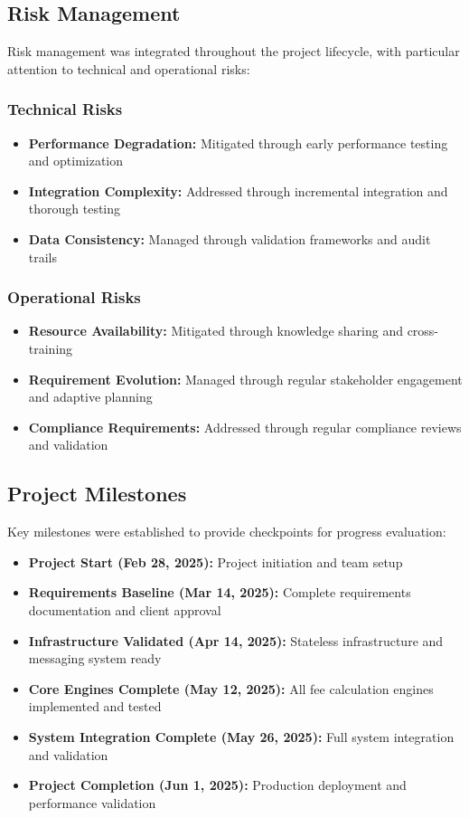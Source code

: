 \subsection{Risk Management}

Risk management was integrated throughout the project lifecycle, with particular attention to technical and operational risks:

\subsubsection{Technical Risks}

\begin{itemize}
    \item \textbf{Performance Degradation:} Mitigated through early performance testing and optimization
    \item \textbf{Integration Complexity:} Addressed through incremental integration and thorough testing
    \item \textbf{Data Consistency:} Managed through validation frameworks and audit trails
\end{itemize}

\subsubsection{Operational Risks}

\begin{itemize}
    \item \textbf{Resource Availability:} Mitigated through knowledge sharing and cross-training
    \item \textbf{Requirement Evolution:} Managed through regular stakeholder engagement and adaptive planning
    \item \textbf{Compliance Requirements:} Addressed through regular compliance reviews and validation
\end{itemize}

\subsection{Project Milestones}

Key milestones were established to provide checkpoints for progress evaluation:

\begin{itemize}
    \item \textbf{Project Start (Feb 28, 2025):} Project initiation and team setup
    \item \textbf{Requirements Baseline (Mar 14, 2025):} Complete requirements documentation and client approval
    \item \textbf{Infrastructure Validated (Apr 14, 2025):} Stateless infrastructure and messaging system ready
    \item \textbf{Core Engines Complete (May 12, 2025):} All fee calculation engines implemented and tested
    \item \textbf{System Integration Complete (May 26, 2025):} Full system integration and validation
    \item \textbf{Project Completion (Jun 1, 2025):} Production deployment and performance validation
\end{itemize}

